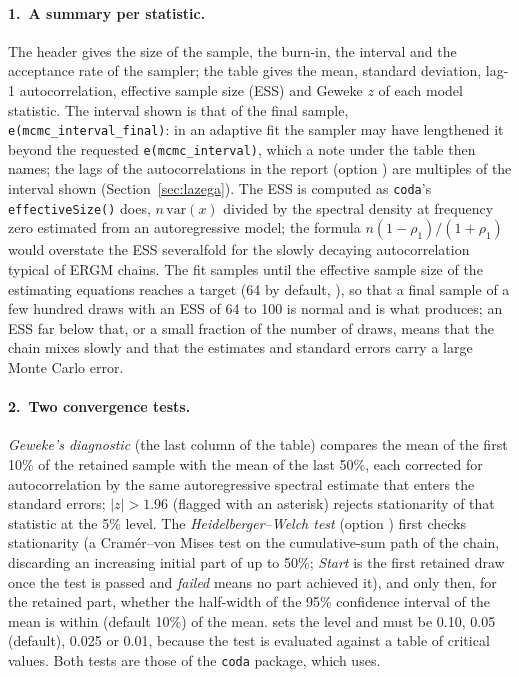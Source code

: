 \paragraph{1.\ A summary per statistic.} The header gives the size of the sample, the burn-in, the interval and the acceptance rate of the sampler; the table gives the mean, standard deviation, lag-1 autocorrelation, effective sample size (ESS) and Geweke $z$ of each model statistic. The interval shown is that of the final sample, \texttt{e(mcmc\_interval\_final)}: in an adaptive fit the sampler may have lengthened it beyond the requested \texttt{e(mcmc\_interval)}, which a note under the table then names; the lags of the autocorrelations in the report (option ) are multiples of the interval shown (Section~\ref{sec:lazega}). The ESS is computed as \texttt{coda}'s \texttt{effectiveSize()} does, $n\,\mathrm{var}(x)$ divided by the spectral density at frequency zero estimated from an autoregressive model; the formula $n(1-\rho_1)/(1+\rho_1)$ would overstate the ESS severalfold for the slowly decaying autocorrelation typical of ERGM chains. The fit samples until the effective sample size of the estimating equations reaches a target (64 by default, ), so that a final sample of a few hundred draws with an ESS of 64 to 100 is normal and is what \ergm{} produces; an ESS far below that, or a small fraction of the number of draws, means that the chain mixes slowly and that the estimates and standard errors carry a large Monte Carlo error.

\paragraph{2.\ Two convergence tests.} \emph{Geweke's diagnostic} (the last column of the table) compares the mean of the first 10\% of the retained sample with the mean of the last 50\%, each corrected for autocorrelation by the same autoregressive spectral estimate that enters the standard errors; $|z|>1.96$ (flagged with an asterisk) rejects stationarity of that statistic at the 5\% level. The \emph{Heidelberger--Welch test} (option ) first checks stationarity (a Cram\'er--von Mises test on the cumulative-sum path of the chain, discarding an increasing initial part of up to 50\%; \emph{Start} is the first retained draw once the test is passed and \emph{failed} means no part achieved it), and only then, for the retained part, whether the half-width of the 95\% confidence interval of the mean is within  (default 10\%) of the mean.  sets the level and must be 0.10, 0.05 (default), 0.025 or 0.01, because the test is evaluated against a table of critical values. Both tests are those of the \texttt{coda} package, which \ergm{} uses.

